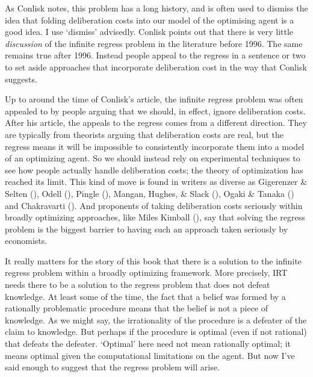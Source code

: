 \documentclass[
  12pt,
  letterpaper,
]{scrbook}
\begin{document}
As Conlisk notes, this problem has a long history, and is often used to
dismiss the idea that folding deliberation costs into our model of the
optimising agent is a good idea. I use `dismiss' advisedly. Conlisk
points out that there is very little \emph{discussion} of the infinite
regress problem in the literature before 1996. The same remains true
after 1996. Instead people appeal to the regress in a sentence or two to
set aside approaches that incorporate deliberation cost in the way that
Conlisk suggests.

Up to around the time of Conlisk's article, the infinite regress problem
was often appealed to by people arguing that we should, in effect,
ignore deliberation costs. After his article, the appeals to the regress
comes from a different direction. They are typically from theorists
arguing that deliberation costs are real, but the regress means it will
be impossible to consistently incorporate them into a model of an
optimizing agent. So we should instead rely on experimental techniques
to see how people actually handle deliberation costs; the theory of
optimization has reached its limit. This kind of move is found in
writers as diverse as Gigerenzer \& Selten
(), Odell
(), Pingle
(), Mangan, Hughes, \& Slack
(), Ogaki \& Tanaka
() and Chakravarti
(). And proponents of taking
deliberation costs seriously within broadly optimizing approaches, like
Miles Kimball (), say that solving the
regress problem is the biggest barrier to having such an approach taken
seriously by economists.

It really matters for the story of this book that there is a solution to
the infinite regress problem within a broadly optimizing framework. More
precisely, IRT needs there to be a solution to the regress problem that
does not defeat knowledge. At least some of the time, the fact that a
belief was formed by a rationally problematic procedure means that the
belief is not a piece of knowledge. As we might say, the irrationality
of the procedure is a defeater of the claim to knowledge. But perhaps if
the procedure is optimal (even if not rational) that defeats the
defeater. `Optimal' here need not mean rationally optimal; it means
optimal given the computational limitations on the agent. But now I've
said enough to suggest that the regress problem will arise.
\end{document}
